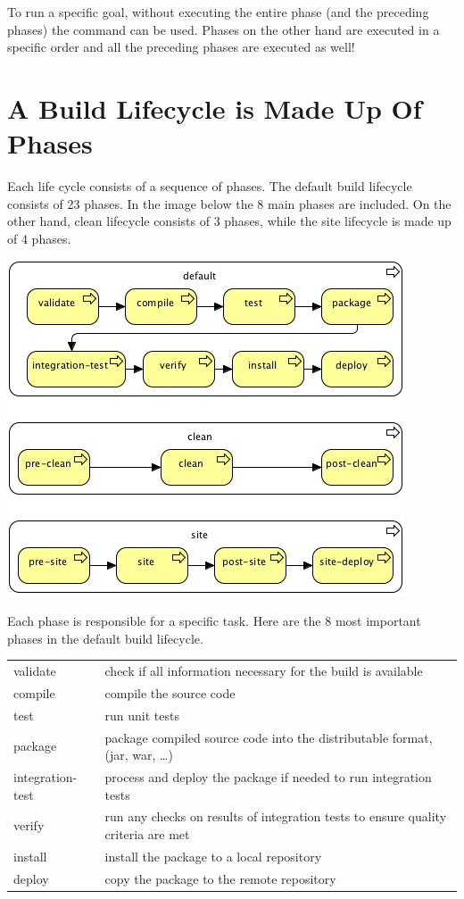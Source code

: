 To run a specific goal, without executing the entire phase (and the preceding phases) the command  can be used.  Phases on the other hand are executed in a specific order and all the preceding phases are executed as well!

\section{A Build Lifecycle is Made Up Of Phases}

Each life cycle consists of a sequence of phases. The default build lifecycle consists of 23 phases. In the image below the 8 main phases are included. On the other hand, clean lifecycle consists of 3 phases, while the site lifecycle is made up of 4 phases.

\includegraphics[width=\textwidth]{./images/maven/maven-lifecycles} 

Each phase is responsible for a specific task. Here are the 8 most important phases in the default build lifecycle.

\begin{tabularx}{\textwidth}{ |l|X| } 
 \hline
validate & check if all information necessary for the build is available \\
compile & compile the source code \\
test & run unit tests \\
package & package compiled source code into the distributable format, (jar, war, …)\\
integration-test & process and deploy the package if needed to run integration tests \\
verify & run any checks on results of integration tests to ensure quality criteria are met\\
install & install the package to a local repository\\
deploy & copy the package to the remote repository\\
 \hline
\end{tabularx}

